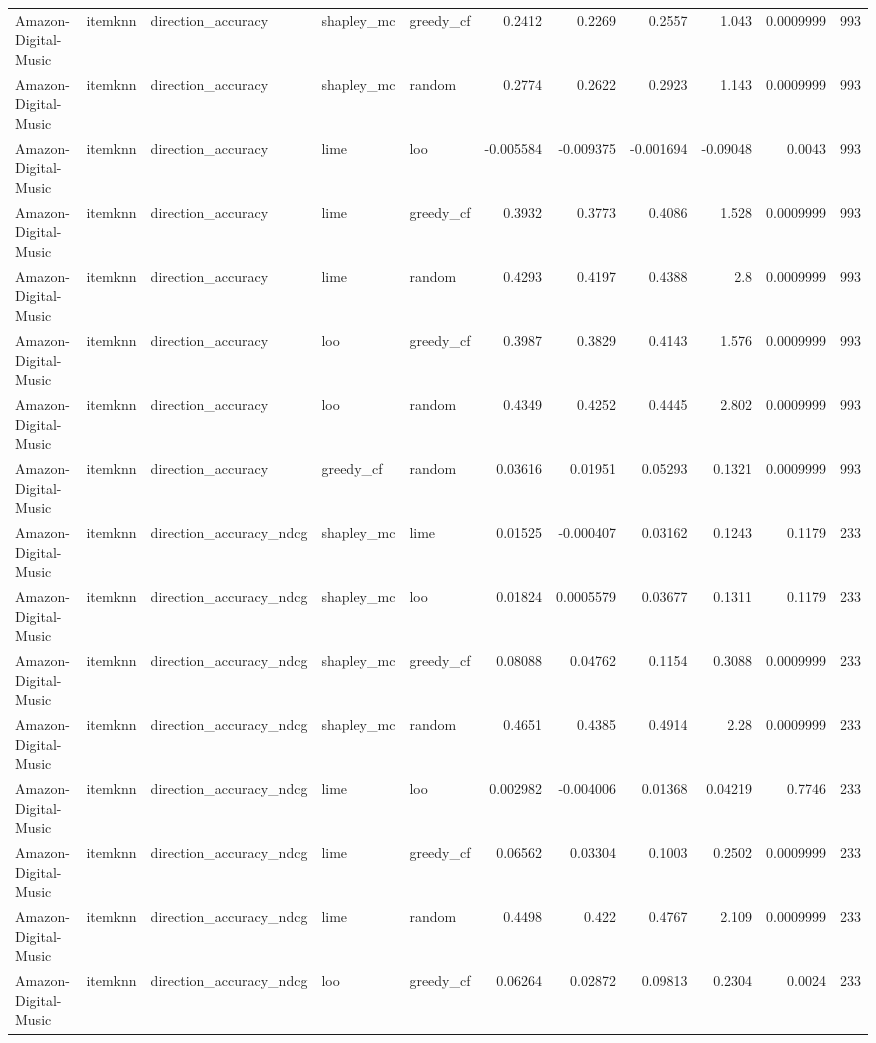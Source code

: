 \begin{table}[t]
\begin{tabular}{lllllrrrrrr}
Amazon-Digital-Music & itemknn & direction\_accuracy & shapley\_mc & greedy\_cf & 0.2412 & 0.2269 & 0.2557 & 1.043 & 0.0009999 & 993 \\
Amazon-Digital-Music & itemknn & direction\_accuracy & shapley\_mc & random & 0.2774 & 0.2622 & 0.2923 & 1.143 & 0.0009999 & 993 \\
Amazon-Digital-Music & itemknn & direction\_accuracy & lime & loo & -0.005584 & -0.009375 & -0.001694 & -0.09048 & 0.0043 & 993 \\
Amazon-Digital-Music & itemknn & direction\_accuracy & lime & greedy\_cf & 0.3932 & 0.3773 & 0.4086 & 1.528 & 0.0009999 & 993 \\
Amazon-Digital-Music & itemknn & direction\_accuracy & lime & random & 0.4293 & 0.4197 & 0.4388 & 2.8 & 0.0009999 & 993 \\
Amazon-Digital-Music & itemknn & direction\_accuracy & loo & greedy\_cf & 0.3987 & 0.3829 & 0.4143 & 1.576 & 0.0009999 & 993 \\
Amazon-Digital-Music & itemknn & direction\_accuracy & loo & random & 0.4349 & 0.4252 & 0.4445 & 2.802 & 0.0009999 & 993 \\
Amazon-Digital-Music & itemknn & direction\_accuracy & greedy\_cf & random & 0.03616 & 0.01951 & 0.05293 & 0.1321 & 0.0009999 & 993 \\
Amazon-Digital-Music & itemknn & direction\_accuracy\_ndcg & shapley\_mc & lime & 0.01525 & -0.000407 & 0.03162 & 0.1243 & 0.1179 & 233 \\
Amazon-Digital-Music & itemknn & direction\_accuracy\_ndcg & shapley\_mc & loo & 0.01824 & 0.0005579 & 0.03677 & 0.1311 & 0.1179 & 233 \\
Amazon-Digital-Music & itemknn & direction\_accuracy\_ndcg & shapley\_mc & greedy\_cf & 0.08088 & 0.04762 & 0.1154 & 0.3088 & 0.0009999 & 233 \\
Amazon-Digital-Music & itemknn & direction\_accuracy\_ndcg & shapley\_mc & random & 0.4651 & 0.4385 & 0.4914 & 2.28 & 0.0009999 & 233 \\
Amazon-Digital-Music & itemknn & direction\_accuracy\_ndcg & lime & loo & 0.002982 & -0.004006 & 0.01368 & 0.04219 & 0.7746 & 233 \\
Amazon-Digital-Music & itemknn & direction\_accuracy\_ndcg & lime & greedy\_cf & 0.06562 & 0.03304 & 0.1003 & 0.2502 & 0.0009999 & 233 \\
Amazon-Digital-Music & itemknn & direction\_accuracy\_ndcg & lime & random & 0.4498 & 0.422 & 0.4767 & 2.109 & 0.0009999 & 233 \\
Amazon-Digital-Music & itemknn & direction\_accuracy\_ndcg & loo & greedy\_cf & 0.06264 & 0.02872 & 0.09813 & 0.2304 & 0.0024 & 233 \\

\end{tabular}
\end{table}
